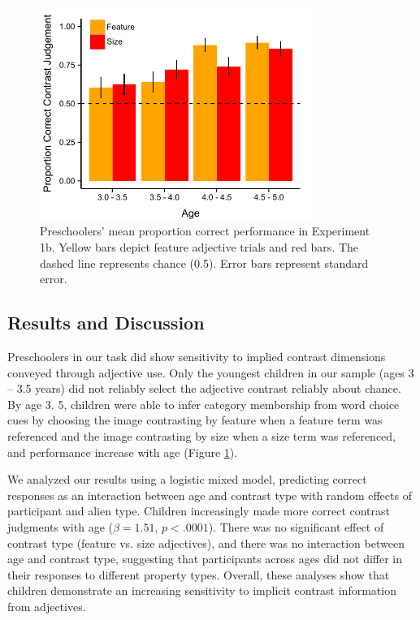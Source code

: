 \documentclass[10pt,letterpaper]{article}
\begin{document}
\begin{figure}[t] 
  \begin{center} 
    \includegraphics[width=3.5in]{figures/experiment1bResults.pdf} 
    \caption{\label{fig:kids1} Preschoolers' mean proportion correct performance in Experiment 1b. Yellow bars depict feature adjective trials and red bars. The dashed line represents chance (0.5). Error bars represent standard error.}
  \end{center} 
\end{figure}	




\subsection{Results and Discussion}

Preschoolers in our task did show sensitivity to implied contrast dimensions conveyed through adjective use.  Only the youngest children in our sample (ages 3 -- 3.5 years) did not reliably select the adjective contrast reliably about chance.  By age 3. 5, children were able to infer category membership from word choice cues by choosing the image contrasting by feature when a feature term was referenced and the image contrasting by size when a size term was referenced, and performance increase with age (Figure \ref{fig:kids1}).


We analyzed our results using a logistic mixed model, predicting correct responses as an interaction between age and contrast type with random effects of participant and alien type.  Children increasingly made more correct contrast judgments with age ($\beta = 1.51$, $p < .0001$).
  There was no significant effect of contrast type (feature vs. size adjectives), and there was no interaction between age and contrast type, suggesting that participants across ages did not differ in their responses to different property types.  Overall, these analyses show that children demonstrate an increasing sensitivity to implicit contrast information from adjectives.  
\end{document}
